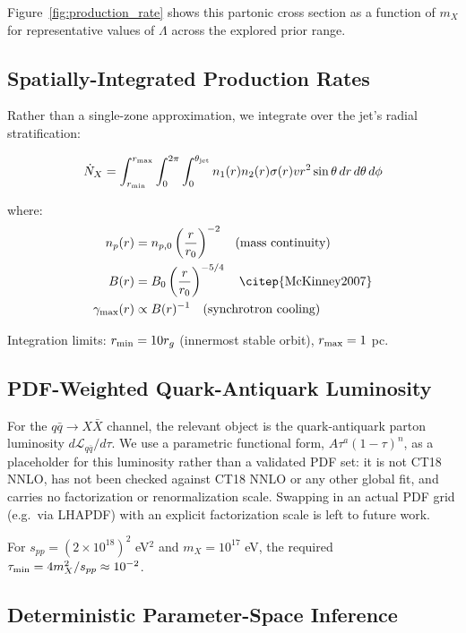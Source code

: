 \documentclass[twocolumn,superscriptaddress,prd,nofootinbib]{revtex4-2}
\begin{document}
Figure~\ref{fig:production_rate} shows this partonic cross section as a function of $m_X$ for representative values of $\Lambda$ across the explored prior range.

\subsection{Spatially-Integrated Production Rates}

Rather than a single-zone approximation, we integrate over the jet's radial stratification:

\begin{equation}
\dot{N}_X = \int_{r_{\rm min}}^{r_{\rm max}} \int_0^{2\pi} \int_0^{\theta_{\rm jet}} n_1(r) n_2(r) \sigma(r) v r^2 \sin\theta \, dr\, d\theta\, d\phi
\label{eq:production_rate_integrated}
\end{equation}

where:
\begin{align}
n_p(r) &= n_{p,0} \left(\frac{r}{r_0}\right)^{-2} \quad \text{(mass continuity)} \\
B(r) &= B_0 \left(\frac{r}{r_0}\right)^{-5/4} \quad \text{\citep{McKinney2007}} \\
\gamma_{\rm max}(r) &\propto B(r)^{-1} \quad \text{(synchrotron cooling)}
\end{align}

Integration limits: $r_{\rm min} = 10 r_g$ (innermost stable orbit), $r_{\rm max} = 1$ pc.

\subsection{PDF-Weighted Quark-Antiquark Luminosity}

For the $q\bar{q}\to X\bar{X}$ channel, the relevant object is the quark-antiquark parton luminosity $d\mathcal{L}_{q\bar q}/d\tau$. We use a parametric functional form, $A\tau^{a}(1-\tau)^{n}$, as a placeholder for this luminosity rather than a validated PDF set: it is not CT18 NNLO, has not been checked against CT18 NNLO or any other global fit, and carries no factorization or renormalization scale. Swapping in an actual PDF grid (e.g.\ via LHAPDF) with an explicit factorization scale is left to future work.

For $s_{pp} = (2 \times 10^{18})^2$ eV$^2$ and $m_X = 10^{17}$ eV, the required $\tau_{\rm min} = 4m_X^2/s_{pp} \approx 10^{-2}$.

\subsection{Deterministic Parameter-Space Inference}
\end{document}

